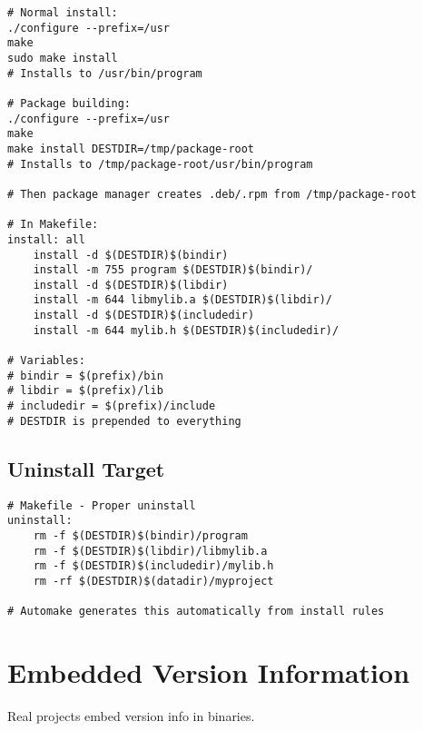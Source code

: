 \begin{lstlisting}
# Normal install:
./configure --prefix=/usr
make
sudo make install
# Installs to /usr/bin/program

# Package building:
./configure --prefix=/usr
make
make install DESTDIR=/tmp/package-root
# Installs to /tmp/package-root/usr/bin/program

# Then package manager creates .deb/.rpm from /tmp/package-root

# In Makefile:
install: all
	install -d $(DESTDIR)$(bindir)
	install -m 755 program $(DESTDIR)$(bindir)/
	install -d $(DESTDIR)$(libdir)
	install -m 644 libmylib.a $(DESTDIR)$(libdir)/
	install -d $(DESTDIR)$(includedir)
	install -m 644 mylib.h $(DESTDIR)$(includedir)/

# Variables:
# bindir = $(prefix)/bin
# libdir = $(prefix)/lib
# includedir = $(prefix)/include
# DESTDIR is prepended to everything
\end{lstlisting}

\subsection{Uninstall Target}

\begin{lstlisting}
# Makefile - Proper uninstall
uninstall:
	rm -f $(DESTDIR)$(bindir)/program
	rm -f $(DESTDIR)$(libdir)/libmylib.a
	rm -f $(DESTDIR)$(includedir)/mylib.h
	rm -rf $(DESTDIR)$(datadir)/myproject

# Automake generates this automatically from install rules
\end{lstlisting}

\section{Embedded Version Information}

Real projects embed version info in binaries.

